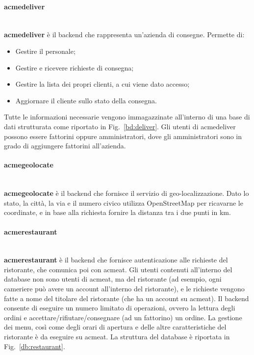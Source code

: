 \documentclass[11pt]{article} %
\begin{document}
\paragraph{acmedeliver}\mbox{}\\
\textbf{acmedeliver} è il backend che rappresenta un'azienda di consegne. Permette di:
\begin{itemize}
\item Gestire il personale;
\item Gestire e ricevere richieste di consegna;
\item Gestire la lista dei propri clienti, a cui viene dato accesso;
\item Aggiornare il cliente sullo stato della consegna.
\end{itemize}
Tutte le informazioni necessarie vengono immagazzinate all'interno di una base di dati strutturata come riportato in Fig.~\ref{bd:deliver}. Gli utenti di acmedeliver possono essere fattorini oppure amministratori, dove gli amministratori sono in grado di aggiungere fattorini all'azienda.

\paragraph{acmegeolocate}\mbox{}\\
\textbf{acmegeolocate} è il backend che fornisce il servizio di geo-localizzazione. Dato lo stato, la città, la via e il numero civico utilizza OpenStreetMap per ricavarne le coordinate, e in base alla richiesta fornire la distanza tra i due punti in km.

\paragraph{acmerestaurant}\mbox{}\\
\textbf{acmerestaurant} è il backend che fornisce autenticazione alle richieste del ristorante, che comunica poi con acmeat. Gli utenti contenuti all'interno del database non sono utenti di acmeat, ma del ristorante (ad esempio, ogni cameriere può avere un account all'interno del ristorante), e le richieste vengono fatte a nome del titolare del ristorante (che ha un account su acmeat). Il backend consente di eseguire un numero limitato di operazioni, ovvero la lettura degli ordini e accettare/rifiutare/consegnare (ad un fattorino) un ordine. La gestione dei menu, così come degli orari di apertura e delle altre caratteristiche del ristorante è da eseguire su acmeat. La struttura del database è riportata in Fig.~\ref{db:restaurant}.
\end{document}
